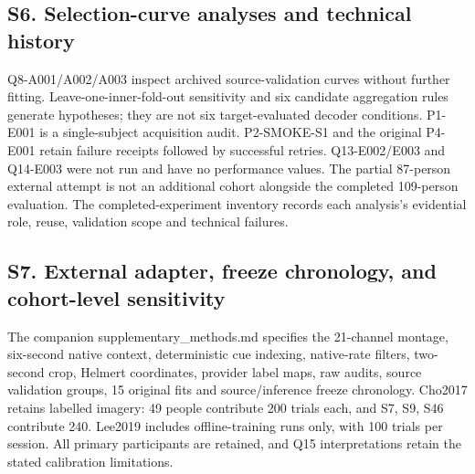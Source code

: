\documentclass[11pt]{article}
\begin{document}
\subsection*{S6. Selection-curve analyses and technical history}
Q8-A001/A002/A003 inspect archived source-validation curves without further fitting. Leave-one-inner-fold-out sensitivity and six candidate aggregation rules generate hypotheses; they are not six target-evaluated decoder conditions. P1-E001 is a single-subject acquisition audit. P2-SMOKE-S1 and the original P4-E001 retain failure receipts followed by successful retries. Q13-E002/E003 and Q14-E003 were not run and have no performance values. The partial 87-person external attempt is not an additional cohort alongside the completed 109-person evaluation. The completed-experiment inventory records each analysis's evidential role, reuse, validation scope and technical failures.

\subsection*{S7. External adapter, freeze chronology, and cohort-level sensitivity}
The companion supplementary\_methods.md specifies the 21-channel montage, six-second native context, deterministic cue indexing, native-rate filters, two-second crop, Helmert coordinates, provider label maps, raw audits, source validation groups, 15 original fits and source/inference freeze chronology. Cho2017 retains labelled imagery: 49 people contribute 200 trials each, and S7, S9, S46 contribute 240. Lee2019 includes offline-training runs only, with 100 trials per session. All primary participants are retained, and Q15 interpretations retain the stated calibration limitations.
\end{document}
